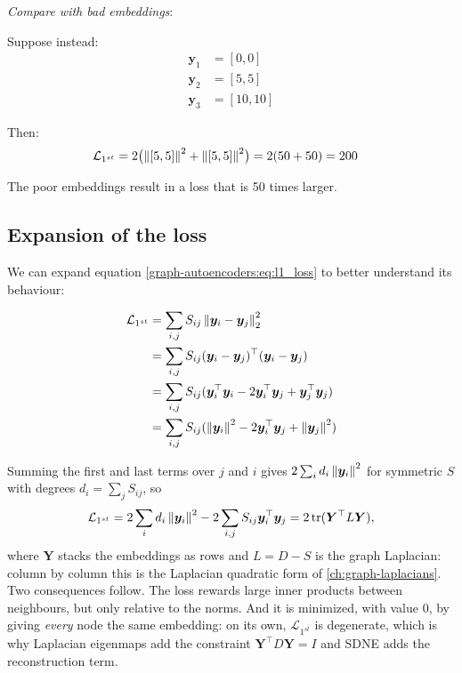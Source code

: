 \begin{notechapter}
\begin{example}
\emph{Compare with bad embeddings}:

Suppose instead:
\begin{align*}
\bm{y}_1 &= [0, 0] \\
\bm{y}_2 &= [5, 5] \\
\bm{y}_3 &= [10, 10]
\end{align*}

Then:
\begin{align*}
\mathcal{L}_{1^{st}} &= 2\bigl(\left\|[5,5]\right\|^2 + \left\|[5,5]\right\|^2\bigr) = 2(50 + 50) = 200
\end{align*}

The poor embeddings result in a loss that is 50 times larger.
\end{example}

\subsection{Expansion of the loss}

We can expand equation \eqref{graph-autoencoders:eq:l1_loss} to better understand its behaviour:

\begin{align}
\mathcal{L}_{1^{st}} &= \sum_{i,j} S_{ij} \left\|\bm{y}_i - \bm{y}_j\right\|^2_2 \nonumber \\
&= \sum_{i,j} S_{ij} (\bm{y}_i - \bm{y}_j)^\top(\bm{y}_i - \bm{y}_j) \nonumber \\
&= \sum_{i,j} S_{ij} (\bm{y}_i^\top\bm{y}_i - 2\bm{y}_i^\top\bm{y}_j + \bm{y}_j^\top\bm{y}_j) \nonumber \\
&= \sum_{i,j} S_{ij} (\left\|\bm{y}_i\right\|^2 - 2\bm{y}_i^\top\bm{y}_j + \left\|\bm{y}_j\right\|^2)
\label{graph-autoencoders:eq:l1_expanded}
\end{align}

Summing the first and last terms over $j$ and $i$ gives $2\sum_id_i\left\|\bm y_i\right\|^2$ for symmetric $S$ with degrees $d_i = \sum_jS_{ij}$, so
\begin{equation}
\mathcal{L}_{1^{st}} = 2\sum_id_i\left\|\bm y_i\right\|^2 - 2\sum_{i,j}S_{ij}\bm y_i^\top\bm y_j = 2\operatorname{tr}(\bm Y^\top L\bm Y),
\label{graph-autoencoders:eq:l1_trace}
\end{equation}
where $\bm Y$ stacks the embeddings as rows and $L = D - S$ is the graph Laplacian: column by column this is the Laplacian quadratic form of \cref{ch:graph-laplacians}. Two consequences follow. The loss rewards large inner products between neighbours, but only relative to the norms. And it is minimized, with value $0$, by giving \emph{every} node the same embedding: on its own, $\mathcal L_{1^{st}}$ is degenerate, which is why Laplacian eigenmaps add the constraint $\bm Y^\top D\bm Y = I$ and SDNE adds the reconstruction term.


\end{notechapter}
